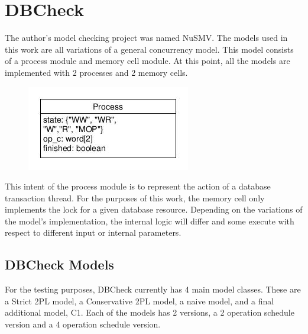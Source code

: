 \section{DBCheck}
The author’s model checking project was named NuSMV. The models used in this work are all variations of a general concurrency model. This model consists of a process module and memory cell module. At this point, all the models are implemented with 2 processes and 2 memory cells. 


\begin{figure}[H]
	\includegraphics[width=\linewidth]{dbcheck_model.jpg}
\end{figure}

This intent of the process module is to represent the action of a database transaction thread. For the purposes of this work, the memory cell only implements the lock for a given database resource. Depending on the variations of the model’s implementation, the internal logic will differ and some execute with respect to different input or internal parameters.

\subsection{DBCheck Models}
For the testing purposes, DBCheck currently has 4 main model classes. These are a Strict 2PL model, a Conservative 2PL model, a naive model, and a final additional model, C1. Each of the models has 2 versions, a 2 operation schedule version and a 4 operation schedule version. 

